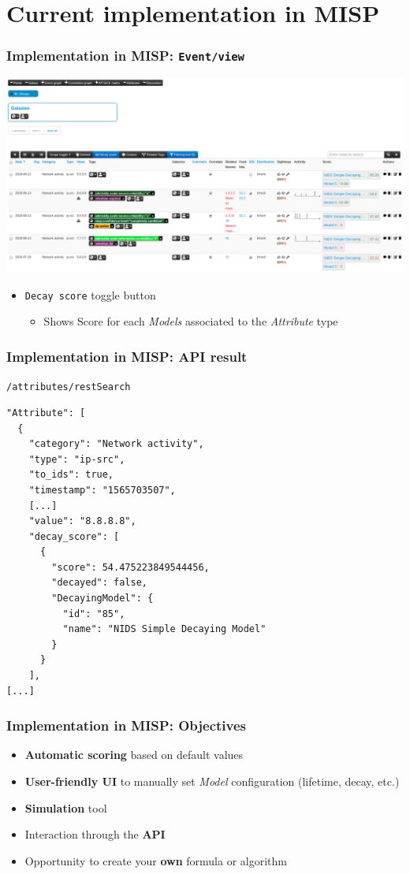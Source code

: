 \section{Current implementation in MISP}
\begin{frame}
    \frametitle{Implementation in MISP: \texttt{Event/view}}
    \includegraphics[width=1.00\linewidth]{pics/decaying-event.png}
    \begin{itemize}
        \item \texttt{Decay score} toggle button
        \begin{itemize}
            \item Shows Score for each \textit{Models} associated to the \textit{Attribute} type
        \end{itemize}
    \end{itemize}
\end{frame}

\begin{frame}[fragile]
    \frametitle{Implementation in MISP: API result}
    \texttt{/attributes/restSearch}
    \begin{lstlisting}
"Attribute": [
  {
    "category": "Network activity",
    "type": "ip-src",
    "to_ids": true,
    "timestamp": "1565703507",
    [...]
    "value": "8.8.8.8",
    "decay_score": [
      {
        "score": 54.475223849544456,
        "decayed": false,
        "DecayingModel": {
          "id": "85",
          "name": "NIDS Simple Decaying Model"
        }
      }
    ],
[...]
    \end{lstlisting}
\end{frame}

\begin{frame}
\frametitle{Implementation in MISP: Objectives}
    \begin{itemize}
        \item \textbf{Automatic scoring} based on default values
        \item \textbf{User-friendly UI} to manually set \textit{Model} configuration (lifetime, decay, etc.)
        \item \textbf{Simulation} tool
        \item Interaction through the \textbf{API}
        \item Opportunity to create your \textbf{own} formula or algorithm
    \end{itemize}
\end{frame}

